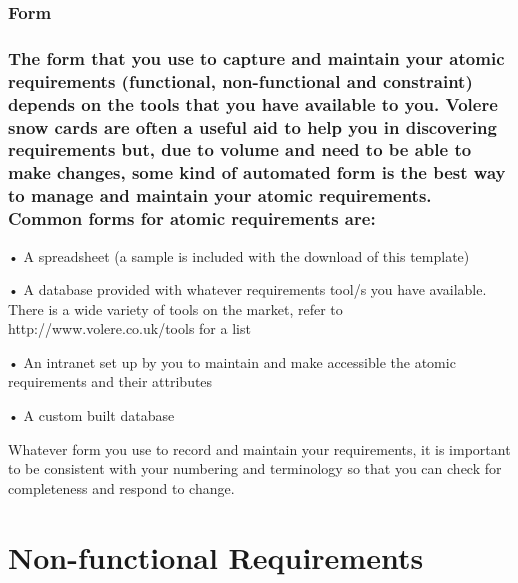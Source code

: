 \documentclass[
]{article}
\begin{document}
\hypertarget{form-28}{%
\subsubsection{Form}\label{form-28}}

\hypertarget{the-form-that-you-use-to-capture-and-maintain-your-atomic-requirements-functional-non-functional-and-constraint-depends-on-the-tools-that-you-have-available-to-you.-volere-snow-cards-are-often-a-useful-aid-to-help-you-in-discovering-requirements-but-due-to-volume-and-need-to-be-able-to-make-changes-some-kind-of-automated-form-is-the-best-way-to-manage-and-maintain-your-atomic-requirements.-common-forms-for-atomic-requirements-are}{%
\subsubsection{The form that you use to capture and maintain your atomic
requirements (functional, non-functional and constraint) depends on the
tools that you have available to you. Volere snow cards are often a
useful aid to help you in discovering requirements but, due to volume
and need to be able to make changes, some kind of automated form is the
best way to manage and maintain your atomic requirements. Common forms
for atomic requirements
are:}\label{the-form-that-you-use-to-capture-and-maintain-your-atomic-requirements-functional-non-functional-and-constraint-depends-on-the-tools-that-you-have-available-to-you.-volere-snow-cards-are-often-a-useful-aid-to-help-you-in-discovering-requirements-but-due-to-volume-and-need-to-be-able-to-make-changes-some-kind-of-automated-form-is-the-best-way-to-manage-and-maintain-your-atomic-requirements.-common-forms-for-atomic-requirements-are}}

• A spreadsheet (a sample is included with the download of this
template)

• A database provided with whatever requirements tool/s you have
available. There is a wide variety of tools on the market, refer to
http://www.volere.co.uk/tools for a list

• An intranet set up by you to maintain and make accessible the atomic
requirements and their attributes

• A custom built database

Whatever form you use to record and maintain your requirements, it is
important to be consistent with your numbering and terminology so that
you can check for completeness and respond to change.

\hypertarget{non-functional-requirements-1}{%
\section{Non-functional
Requirements}\label{non-functional-requirements-1}}
\end{document}
